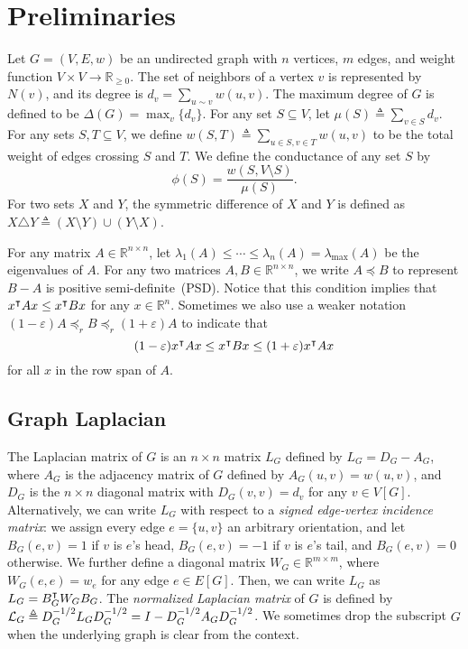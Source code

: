 
\section{Preliminaries\label{sec:preliminaries}}

Let 
 $G=(V,E,w)$ be an undirected   graph with $n$ vertices,   $m$ edges, and weight function $V\times V\rightarrow \mathbb{R}_{\geq 0}$. 
The set of neighbors of a vertex $v$ is represented by $N(v)$,
and its degree is $d_v=\sum_{u\sim v} w(u,v)$. The maximum degree of $G$ is defined to be $\Delta(G)=\max_{v}\{d_v\}$. 
For any set $S\subseteq V$, let $\mu(S)\triangleq\sum_{v\in S} d_v$.
For any sets $S, T\subseteq V$, we define
$w(S,T)\triangleq \sum_{u\in S, v\in T} w(u,v)$ to be the total weight of edges crossing $S$ and $T$.
We define the conductance of any set $S$ by
\[
\phi(S)=\frac{w(S, V\setminus S)}{\mu(S)}.
\]
For two sets $X$ and $Y$, the symmetric difference of $X$ and $Y$ is defined
as $X\triangle Y\triangleq (X\setminus Y)\cup (Y\setminus X)$. 


For any matrix $A\in\mathbb{R}^{n\times n }$, let $\lambda_1(A)\leq\cdots \leq \lambda_n(A)=\lambda_{\max}(A)$ be the eigenvalues of $A$. For any two matrices $A, B\in\mathbb{R}^{n\times n}$, we write $A\preceq B$ to represent $B-A$ is positive semi-definite~(\textsf{PSD}). Notice that this condition implies that $x^{\intercal}Ax\leq x^{\intercal}Bx$ for any $x\in\mathbb{R}^n$. Sometimes we also use a weaker notation
$(1-\varepsilon)A\preceq_r B\preceq_r (1+\varepsilon)A$ to indicate that 
\[
(1-\varepsilon)x^{\intercal}Ax\leq x^{\intercal}Bx\leq (1+\varepsilon)x^{\intercal}Ax
\] for all $x$ in the row span of $A$.


\subsection{Graph Laplacian}  The Laplacian matrix of $G$ is an $n\times n$ matrix $L_G$ defined by 
$L_G=D_G-A_G$, where $A_G$ is the adjacency matrix of $G$ defined by $A_G(u,v)=w(u,v)$, and $D_G$ is the $n\times n$ diagonal matrix with $D_G(v,v)=d_v$ for any $v\in V[G]$.  Alternatively, we can write $L_G$ with respect to a \emph{signed edge-vertex incidence matrix}:  we assign every edge $e=\{u,v\}$ an arbitrary orientation, and let $B_G(e,v)=1$ if $v$ is $e$'s head, $B_G(e,v)=-1$ if $v$ is $e$'s tail, and $B_G(e,v)=0$ otherwise.
We further define a diagonal matrix $W_G\in\mathbb{R}^{m\times m}$, where $W_G(e,e)=w_e$ for any edge $e\in E[G]$. Then, we can write $L_G$ as $L_G=B_G^{\intercal}W_GB_G$. The \emph{normalized Laplacian matrix} of $G$ is defined by
$
\mathcal{L}_G\triangleq D_G^{-1/2}L_GD_G^{-1/2} = I-D_G^{-1/2}A_GD_G^{-1/2}$.
We sometimes drop the subscript $G$ when the underlying graph is clear from the context. 

